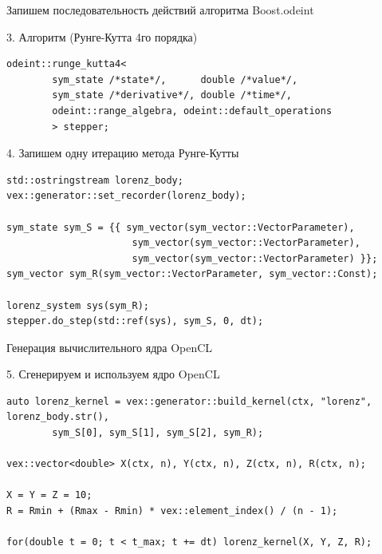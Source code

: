 \documentclass[@BEAMER_OPTIONS@]{beamer}
\begin{document}
\begin{frame}[fragile]{Запишем последовательность действий алгоритма Boost.odeint}
    \begin{exampleblock}{3. Алгоритм (Рунге-Кутта 4го порядка)}
        \begin{lstlisting}[firstnumber=last]
odeint::runge_kutta4<
        sym_state /*state*/,      double /*value*/,
        sym_state /*derivative*/, double /*time*/,
        odeint::range_algebra, odeint::default_operations
        > stepper;
        \end{lstlisting}
    \end{exampleblock}

    \begin{exampleblock}{4. Запишем одну итерацию метода Рунге-Кутты}
        \begin{lstlisting}[firstnumber=last]
std::ostringstream lorenz_body;
vex::generator::set_recorder(lorenz_body);

sym_state sym_S = {{ sym_vector(sym_vector::VectorParameter),
                      sym_vector(sym_vector::VectorParameter),
                      sym_vector(sym_vector::VectorParameter) }};
sym_vector sym_R(sym_vector::VectorParameter, sym_vector::Const);

lorenz_system sys(sym_R);
stepper.do_step(std::ref(sys), sym_S, 0, dt);
        \end{lstlisting}
    \end{exampleblock}
\end{frame}


\begin{frame}[fragile]{Генерация вычислительного ядра OpenCL}
    \begin{exampleblock}{5. Сгенерируем и используем ядро OpenCL}
        \begin{lstlisting}[firstnumber=last]
auto lorenz_kernel = vex::generator::build_kernel(ctx, "lorenz", lorenz_body.str(),
        sym_S[0], sym_S[1], sym_S[2], sym_R);

vex::vector<double> X(ctx, n), Y(ctx, n), Z(ctx, n), R(ctx, n);

X = Y = Z = 10;
R = Rmin + (Rmax - Rmin) * vex::element_index() / (n - 1);

for(double t = 0; t < t_max; t += dt) lorenz_kernel(X, Y, Z, R);
        \end{lstlisting}
    \end{exampleblock}
\end{frame}
\end{document}
